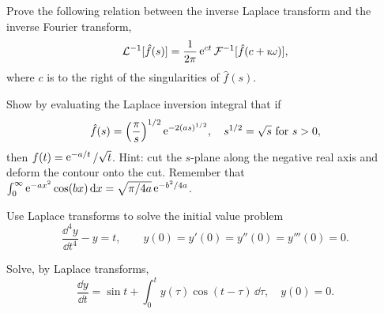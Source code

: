 {\begin{Exercise}
\end{Exercise}







\begin{Exercise}
  \label{exercise relation Laplace Fourier}
  Prove the following relation between the inverse Laplace transform and
  the inverse Fourier transform,
  \[
  \mathcal{L}^{-1} [\hat{f}(s)] = \frac{1}{2\pi} \mathop{\mathrm{e}}\nolimits^{c t} \mathcal{F}^{-1}
  [\hat{f}(c + \imath \omega)],
  \]
  where $c$ is to the right of the singularities of $\hat{f}(s)$.

\end{Exercise}





\begin{Exercise}
  \label{exercise F(s)=(pi/s)1/2 e -2(as)1/2}
  Show by evaluating the Laplace inversion integral that if
  \[
  \hat{f}(s) = \left( \frac{\pi}{s} \right)^{1/2} \mathop{\mathrm{e}}\nolimits^{-2 (a s)^{1/2} }, \quad
  s^{1/2} = \sqrt{s}\ \mathrm{for}\ s > 0,
  \]
  then $f(t) = \mathop{\mathrm{e}}\nolimits^{-a / t} / \sqrt{t}$.  Hint:  cut the $s$-plane along the 
  negative real axis and deform the contour onto the cut.  Remember that 
  $\int_0^\infty \mathop{\mathrm{e}}\nolimits^{-a x^2} \cos (b x) \,\mathrm{d} x = \sqrt{ \pi / 4 a } \mathop{\mathrm{e}}\nolimits^{-b^2 / 4 a}$.

\end{Exercise}






\begin{Exercise}
  \label{exercise y''''-y=t}
  Use Laplace transforms to solve the initial value problem
  \[
  \frac{\dd^4 y}{\dd t^4} - y = t, \qquad
  y(0) = y'(0) = y''(0) = y'''(0) = 0.
  \]

\end{Exercise}








\begin{Exercise}
  \label{exercise y'=sin t int y cos}
  Solve, by Laplace transforms,
  \[
  \frac{\dd y}{\dd t} = \sin t + \int_0^t y(\tau) \cos(t - \tau) \,\dd \tau, \quad y(0) = 0.
  \]


\end{Exercise}}

